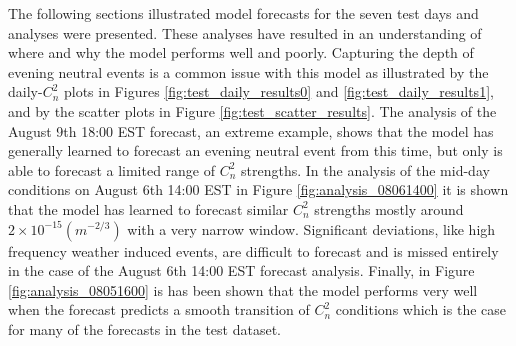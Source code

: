 The following sections illustrated model forecasts for the seven test days and analyses were presented. These analyses have resulted in an understanding of where and why the model performs well and poorly. Capturing the depth of evening neutral events is a common issue with this model as illustrated by the daily-$C_{n}^{2}$ plots in Figures \ref{fig:test_daily_results0} and \ref{fig:test_daily_results1}, and by the scatter plots in Figure \ref{fig:test_scatter_results}. The analysis of the August 9th 18:00 EST forecast, an extreme example, shows that the model has generally learned to forecast an evening neutral event from this time, but only is able to forecast a limited range of $C_{n}^{2}$ strengths. In the analysis of the mid-day conditions on August 6th 14:00 EST in Figure \ref{fig:analysis_08061400} it is shown that the model has learned to forecast similar $C_{n}^{2}$ strengths mostly around $2 \times 10^{-15} (m^{-2/3})$ with a very narrow window. Significant deviations, like high frequency weather induced events, are difficult to forecast and is missed entirely in the case of the August 6th 14:00 EST forecast analysis. Finally, in Figure \ref{fig:analysis_08051600} is has been shown that the model performs very well when the forecast predicts a smooth transition of $C_{n}^{2}$ conditions which is the case for many of the forecasts in the test dataset. 